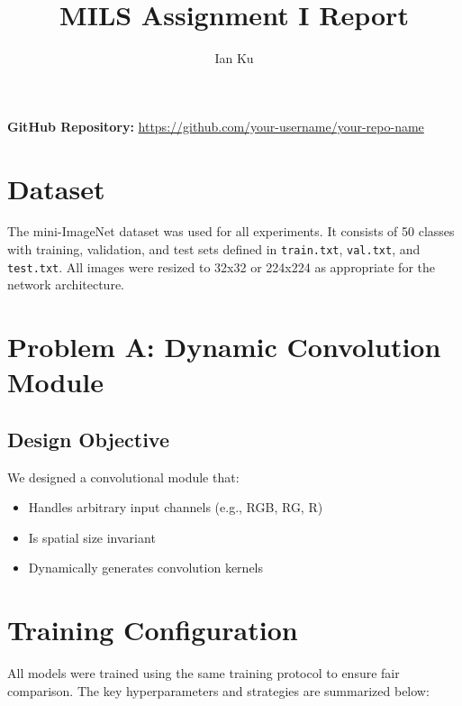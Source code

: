 \documentclass[12pt]{article}
\title{MILS Assignment I Report}
\author{Ian Ku}
\date{}
\begin{document}
\maketitle
\noindent\textbf{GitHub Repository:} \url{https://github.com/your-username/your-repo-name}
\section*{Dataset}
The mini-ImageNet dataset was used for all experiments. It consists of 50 classes with training, validation, and test sets defined in \texttt{train.txt}, \texttt{val.txt}, and \texttt{test.txt}. All images were resized to 32x32 or 224x224 as appropriate for the network architecture.

\section*{Problem A: Dynamic Convolution Module}

\subsection*{Design Objective}
We designed a convolutional module that:
\begin{itemize}[noitemsep]
    \item Handles arbitrary input channels (e.g., RGB, RG, R)
    \item Is spatial size invariant
    \item Dynamically generates convolution kernels
\end{itemize}

\section*{Training Configuration}

All models were trained using the same training protocol to ensure fair comparison. The key hyperparameters and strategies are summarized below:
\end{document}
